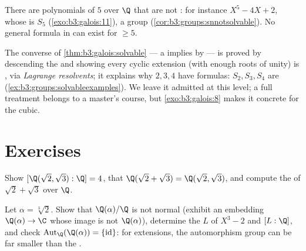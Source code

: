 \begin{corollary}
\label{cor:b3:galois:quintic}
There are polynomials of  $5$ over $\Q$ that are not
: for instance $X^5 - 4X + 2$, whose  is $S_5$ (\cref{exo:b3:galois:11}), a  group
(\cref{cor:b3:groups:snnotsolvable}). No general formula in
 can exist for  $\geq 5$.
\end{corollary}

\begin{remark}\label{rem:b3:galois:converse}
The converse of \cref{thm:b3:galois:solvable} --- a 
 implies  by  --- is proved by
descending the  and showing every cyclic extension
(with enough roots of unity) is , via \emph{Lagrange
resolvents}; it explains why  $2, 3, 4$ have formulas:
$S_2, S_3, S_4$ are 
(\cref{ex:b3:groups:solvableexamples}). We leave it admitted at
this level; a full treatment belongs to a master's course, but
\cref{exo:b3:galois:8} makes it concrete for the cubic.
\end{remark}

\section{Exercises}

\begin{exercise}[$\star$]\label{exo:b3:galois:1}
Show $[\Q(\sqrt2, \sqrt3):\Q] = 4$, that $\Q(\sqrt2 + \sqrt3) =
\Q(\sqrt2, \sqrt3)$, and compute the  of
$\sqrt2 + \sqrt3$ over $\Q$.
\end{exercise}

\begin{exercise}[$\star$]\label{exo:b3:galois:2}
Let $\alpha = \sqrt[3]2$. Show that $\Q(\alpha)/\Q$ is not
normal (exhibit an embedding $\Q(\alpha) \to \C$ whose image is
not $\Q(\alpha)$), determine the  $L$ of $X^3 -
2$ and $[L:\Q]$, and check $\operatorname{Aut}_\Q(\Q(\alpha)) =
\{\mathrm{id}\}$: for  extensions, the automorphism
group can be far smaller than the .
\end{exercise}

